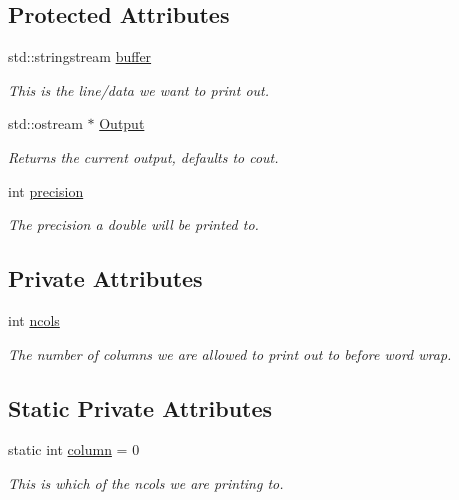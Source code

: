 \subsection*{Protected Attributes}
\begin{DoxyCompactItemize}
\item 
std::stringstream \hyperlink{classJKBuilder_1_1IOManager_adbf6a7492c6521b38c1510aebe307770}{buffer}
\begin{DoxyCompactList}\small\item\em This is the line/data we want to print out. \item\end{DoxyCompactList}\item 
std::ostream $\ast$ \hyperlink{classJKBuilder_1_1IOManager_aafe3b1218427d92a689d147f74e74f4b}{Output}
\begin{DoxyCompactList}\small\item\em Returns the current output, defaults to cout. \item\end{DoxyCompactList}\item 
int \hyperlink{classJKBuilder_1_1IOManager_aa95455ed52a8459fad69509a4a0411b5}{precision}
\begin{DoxyCompactList}\small\item\em The precision a double will be printed to. \item\end{DoxyCompactList}\end{DoxyCompactItemize}
\subsection*{Private Attributes}
\begin{DoxyCompactItemize}
\item 
int \hyperlink{classJKBuilder_1_1printer_a7c4b990ebe8d2c098f3974f6ffe0c9b4}{ncols}
\begin{DoxyCompactList}\small\item\em The number of columns we are allowed to print out to before word wrap. \item\end{DoxyCompactList}\end{DoxyCompactItemize}
\subsection*{Static Private Attributes}
\begin{DoxyCompactItemize}
\item 
static int \hyperlink{classJKBuilder_1_1printer_a60dae4c6e78188cd718b696e4f08fc71}{column} = 0
\begin{DoxyCompactList}\small\item\em This is which of the ncols we are printing to. \item\end{DoxyCompactList}\end{DoxyCompactItemize}


